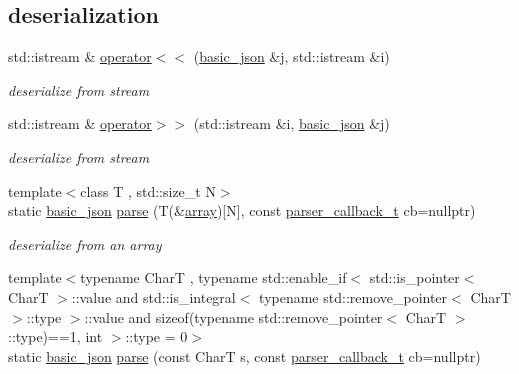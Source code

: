 \subsection*{deserialization}
\begin{DoxyCompactItemize}
\item 
std\+::istream \& \mbox{\hyperlink{classnlohmann_1_1basic__json_a60ca396028b8d9714c6e10efbf475af6}{operator$<$$<$}} (\mbox{\hyperlink{classnlohmann_1_1basic__json}{basic\+\_\+json}} \&j, std\+::istream \&i)
\begin{DoxyCompactList}\small\item\em deserialize from stream \end{DoxyCompactList}\item 
std\+::istream \& \mbox{\hyperlink{classnlohmann_1_1basic__json_aaf363408931d76472ded14017e59c9e8}{operator$>$$>$}} (std\+::istream \&i, \mbox{\hyperlink{classnlohmann_1_1basic__json}{basic\+\_\+json}} \&j)
\begin{DoxyCompactList}\small\item\em deserialize from stream \end{DoxyCompactList}\item 
{\footnotesize template$<$class T , std\+::size\+\_\+t N$>$ }\\static \mbox{\hyperlink{classnlohmann_1_1basic__json}{basic\+\_\+json}} \mbox{\hyperlink{classnlohmann_1_1basic__json_a86f339e8449cce96b89e86635a7d389e}{parse}} (T(\&\mbox{\hyperlink{classnlohmann_1_1basic__json_a4a4ec75e4d2845d9bcf7a9e5458e4949}{array}})\mbox{[}N\mbox{]}, const \mbox{\hyperlink{classnlohmann_1_1basic__json_aecae491e175f8767c550ae3c59e180e3}{parser\+\_\+callback\+\_\+t}} cb=nullptr)
\begin{DoxyCompactList}\small\item\em deserialize from an array \end{DoxyCompactList}\item 
{\footnotesize template$<$typename CharT , typename std\+::enable\+\_\+if$<$ std\+::is\+\_\+pointer$<$ Char\+T $>$\+::value and std\+::is\+\_\+integral$<$ typename std\+::remove\+\_\+pointer$<$ Char\+T $>$\+::type $>$\+::value and sizeof(typename std\+::remove\+\_\+pointer$<$ Char\+T $>$\+::type)==1, int $>$\+::type  = 0$>$ }\\static \mbox{\hyperlink{classnlohmann_1_1basic__json}{basic\+\_\+json}} \mbox{\hyperlink{classnlohmann_1_1basic__json_ab275a3e00a40189e96d244de6c8f311a}{parse}} (const CharT s, const \mbox{\hyperlink{classnlohmann_1_1basic__json_aecae491e175f8767c550ae3c59e180e3}{parser\+\_\+callback\+\_\+t}} cb=nullptr)

\end{DoxyCompactItemize}
